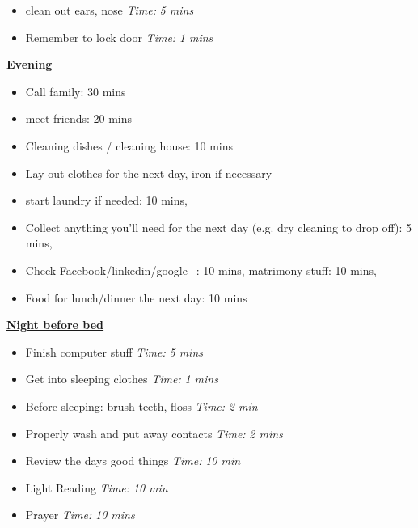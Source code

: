 \documentclass[11pt]{article}
\newcommand{\timeEst}[1]{\textit{Time:} \textit{#1}}
\begin{document}
{\begin{itemize}
                \item \tiny clean out ears, nose \timeEst{5 mins}
                \item \tiny Remember to lock door \timeEst{1 mins}
                \end{itemize}                 
                \underline{\textbf{Evening}}
                \begin{itemize}
                  \tiny \item \tiny Call family: 30 mins
                \item \tiny meet friends: 20 mins
                \item \tiny Cleaning dishes / cleaning house: 10 mins
                \item \tiny Lay out clothes for the next day, iron if necessary
                \item \tiny start laundry if needed: 10 mins,
                \item \tiny Collect anything you’ll need for the next day (e.g. dry cleaning to drop off): 5 mins,
                \item \tiny Check Facebook/linkedin/google+: 10 mins, matrimony stuff: 10 mins,
                \item \tiny Food for lunch/dinner the next day: 10 mins
                \end{itemize}  

                \underline{\textbf{Night before bed}}
                \begin{itemize}
                  \tiny \item \tiny Finish computer stuff \timeEst{5 mins}
                \item \tiny Get into sleeping clothes \timeEst{1 mins}
                \item \tiny Before sleeping: brush teeth, floss \timeEst{ 2 min}
                \item \tiny Properly wash and put away contacts \timeEst{ 2 mins}
                \item \tiny Review the days good things \timeEst{ 10 min}
                \item \tiny Light Reading \timeEst{ 10 min}
                \item \tiny Prayer \timeEst{10 mins}
            \end{itemize} 
            \newpage

}
\end{document}
